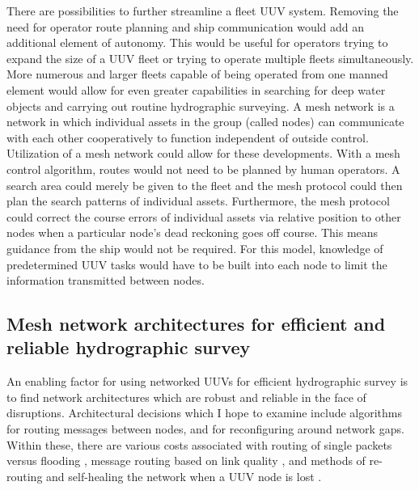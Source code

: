 \documentclass[twocolumn,10pt]{IEEEtran}
\begin{document}
There are possibilities to further streamline a fleet UUV system. Removing the need for operator route planning and ship communication would add an additional element of autonomy. This would be useful for operators trying to expand the size of a UUV fleet or trying to operate multiple fleets simultaneously. More numerous and larger fleets capable of being operated from one manned element would allow for even greater capabilities in searching for deep water objects and carrying out routine hydrographic surveying. A mesh network is a network in which individual assets in the group (called nodes) can communicate with each other cooperatively to function independent of outside control. Utilization of a mesh network could allow for these developments. With a mesh control algorithm, routes would not need to be planned by human operators. A search area could merely be given to the fleet and the mesh protocol could then plan the search patterns of individual assets. Furthermore, the mesh protocol could correct the course errors of individual assets via relative position to other nodes when a particular node’s dead reckoning goes off course. This means guidance from the ship would not be required. For this model, knowledge of predetermined UUV tasks would have to be built into each node to limit the information transmitted between nodes. 



\subsection{Mesh network architectures for efficient and reliable hydrographic survey}

An enabling factor for using networked UUVs for efficient hydrographic survey is to find network architectures which are robust and reliable in the face of disruptions. Architectural decisions which I hope to examine include algorithms for routing messages between nodes, and for reconfiguring around network gaps. Within these, there are various costs associated with routing of single packets versus flooding \cite{zahn2009empirical}, message routing based on link quality \cite{hamraz2019wireless}, and methods of re-routing and self-healing the network when a UUV node is lost \cite{trehan2019algorithms}. 
\end{document}
